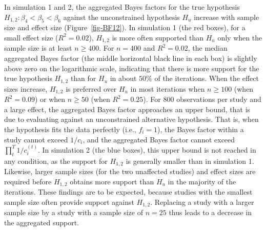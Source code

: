 \documentclass[
]{interact}
\begin{document}
                    In simulation 1 and 2, the aggregated Bayes factors for the true
                    hypothesis \(H_{1,2}: \beta_4 < \beta_5 < \beta_6\) against the
                    unconstrained hypothesis \(H_u\) increase with sample size and effect
                    size (Figure~\ref{fig-BF12}). In simulation 1 (the red boxes), for a
                    small effect size (\(R^2 = 0.02\)), \(H_{1,2}\) is more often supported
                    than \(H_u\) only when the sample size is at least \(n \geq 400\). For
                    \(n = 400\) and \(R^2 = 0.02\), the median aggregated Bayes factor (the
                                                                                        middle horizontal black line in each box) is slightly above zero on the
                    logarithmic scale, indicating that there is more support for the true
                    hypothesis \(H_{1,2}\) than for \(H_u\) in about \(50\%\) of the
                    iterations. When the effect sizes increase, \(H_{1,2}\) is preferred
                    over \(H_u\) in most iterations when \(n \geq 100\) (when
                                                                         \(R^2 = 0.09\)) or when \(n \geq 50\) (when \(R^2 = 0.25\)). For \(800\)
                    observations per study and a large effect, the aggregated Bayes factor
                    approaches an upper bound, that is due to evaluating against an
                    unconstrained alternative hypothesis. That is, when the hypothesis fits
                    the data perfectly (i.e., \(f_i = 1\)), the Bayes factor within a study
                    cannot exceed \(1/c_i\), and the aggregated Bayes factor cannot exceed
                    \(\prod_t^T 1/c_i^{(t)}\). In simulation 2 (the blue boxes), this upper
                    bound is not reached in any condition, as the support for \(H_{1,2}\) is
                    generally smaller than in simulation 1. Likewise, larger sample sizes
                    (for the two unaffected studies) and effect sizes are required before
                    \(H_{1,2}\) obtains more support than \(H_u\) in the majority of the
                    iterations. These findings are to be expected, because studies with the
                    smallest sample size often provide support against \(H_{1,2}\).
                    Replacing a study with a larger sample size by a study with a sample
                    size of \(n = 25\) thus leads to a decrease in the aggregated support.
                    
\end{document}
